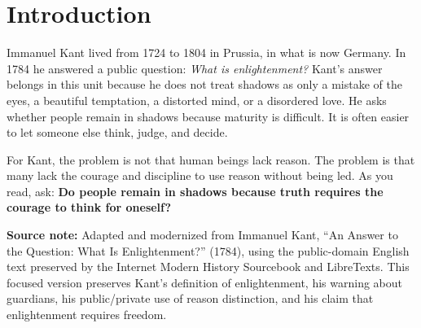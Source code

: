 \documentclass[12pt]{article}
\newcommand{\focusbox}[1]{%
\vspace{0.4em}\noindent\colorbox{gray!12}{\begin{minipage}{0.96\linewidth}#1\end{minipage}}\vspace{0.5em}}
\begin{document}
\section*{Introduction}
Immanuel Kant lived from 1724 to 1804 in Prussia, in what is now Germany. In 1784 he answered a public question: \textit{What is enlightenment?} Kant's answer belongs in this unit because he does not treat shadows as only a mistake of the eyes, a beautiful temptation, a distorted mind, or a disordered love. He asks whether people remain in shadows because maturity is difficult. It is often easier to let someone else think, judge, and decide.

For Kant, the problem is not that human beings lack reason. The problem is that many lack the courage and discipline to use reason without being led. As you read, ask: \textbf{Do people remain in shadows because truth requires the courage to think for oneself?}

\focusbox{\textbf{Source note:} Adapted and modernized from Immanuel Kant, ``An Answer to the Question: What Is Enlightenment?'' (1784), using the public-domain English text preserved by the Internet Modern History Sourcebook and LibreTexts. This focused version preserves Kant's definition of enlightenment, his warning about guardians, his public/private use of reason distinction, and his claim that enlightenment requires freedom.}
\end{document}
